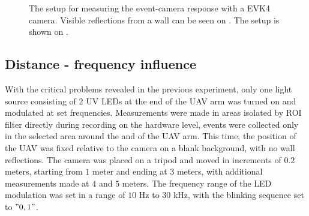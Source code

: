 \begin{figure}[H]
	\centering
	\caption{
  The setup for measuring the event-camera response with a EVK4 camera. Visible reflections from a wall can be seen on . The setup is shown on .
  }
	\label{fig:meas1}
\end{figure}


\subsection{Distance - frequency influence}

With the critical problems revealed in the previous experiment, only one light source consisting of 2 \ac{UV} \ac{LED}s at the end of the \ac{UAV} arm was turned on and
modulated at set frequencies.
Measurements were made in areas isolated by \ac{ROI} filter directly during recording on the hardware level, events were collected only in the
selected area around the and of the \ac{UAV} arm.
This time, the position of the \ac{UAV} was fixed relative to the camera on a blank background, with no wall reflections. The camera was placed on a tripod
and moved in increments of $0.2$ meters, starting from $1$ meter and ending at $3$ meters, with additional measurements made
at $4$ and $5$ meters.
The frequency range of the LED modulation was set in a range of $10$ Hz to $30$ kHz, with the blinking sequence set to $"0, 1"$.

